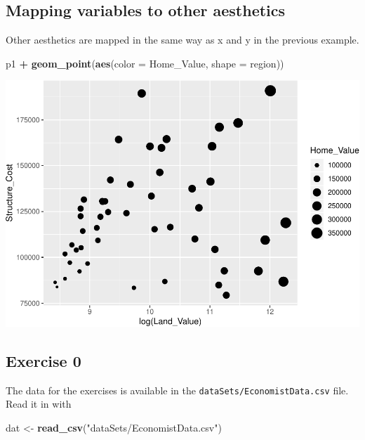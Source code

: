 \documentclass[]{book}
\newenvironment{Shaded}{\begin{snugshade}}{\end{snugshade}}
\newcommand{\DataTypeTok}[1]{\textcolor[rgb]{0.13,0.29,0.53}{#1}}
\newcommand{\KeywordTok}[1]{\textcolor[rgb]{0.13,0.29,0.53}{\textbf{#1}}}
\newcommand{\NormalTok}[1]{#1}
\newcommand{\OperatorTok}[1]{\textcolor[rgb]{0.81,0.36,0.00}{\textbf{#1}}}
\newcommand{\StringTok}[1]{\textcolor[rgb]{0.31,0.60,0.02}{#1}}
\begin{document}
\hypertarget{mapping-variables-to-other-aesthetics}{%
\subsection{Mapping variables to other aesthetics}\label{mapping-variables-to-other-aesthetics}}

Other aesthetics are mapped in the same way as x and y in the previous example.

\begin{Shaded}
\begin{Highlighting}[]
\NormalTok{p1 }\OperatorTok{+}
\StringTok{  }\KeywordTok{geom_point}\NormalTok{(}\KeywordTok{aes}\NormalTok{(}\DataTypeTok{color =}\NormalTok{ Home_Value, }\DataTypeTok{shape =}\NormalTok{ region))}
\end{Highlighting}
\end{Shaded}

\includegraphics{R/Rgraphics/figures/unnamed-chunk-152-1.pdf}

\hypertarget{exercise-0-2}{%
\subsection{Exercise 0}\label{exercise-0-2}}

The data for the exercises is available in the \texttt{dataSets/EconomistData.csv} file. Read it in with

\begin{Shaded}
\begin{Highlighting}[]
\NormalTok{dat <-}\StringTok{ }\KeywordTok{read_csv}\NormalTok{(}\StringTok{"dataSets/EconomistData.csv"}\NormalTok{)}
\end{Highlighting}
\end{Shaded}
\end{document}

